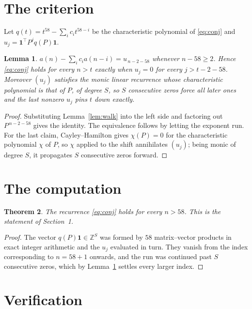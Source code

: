 \documentclass[11pt,a4paper]{article}
\theoremstyle{plain}
\newtheorem{theorem}{Theorem}
\newtheorem{lemma}[theorem]{Lemma}
\theoremstyle{definition}
\begin{document}
\section{The criterion}

Let $q(t)=t^{58}-\sum_i c_i t^{58-i}$ be the characteristic polynomial of
\eqref{eq:conj} and $u_j=\mathbf{1}^{\!\top}P^{j}q(P)\mathbf{1}$.

\begin{lemma}\label{lem:crit}
$a(n)-\sum_i c_i a(n-i)=u_{\,n-2-58}$ whenever $n-58\ge2$. Hence
\eqref{eq:conj} holds for every $n>t$ exactly when $u_j=0$ for every
$j>t-2-58$. Moreover $(u_j)$ satisfies the monic linear recurrence whose
characteristic polynomial is that of $P$, of degree $S$, so $S$ consecutive zeros force all
later ones and the last nonzero $u_j$ pins $t$ down exactly.
\end{lemma}

\begin{proof}
Substituting Lemma~\ref{lem:walk} into the left side and factoring out
$P^{\,n-2-58}$ gives the identity. The equivalence follows by letting the exponent
run. For the last claim, Cayley--Hamilton gives $\chi(P)=0$ for the characteristic
polynomial $\chi$ of $P$, so $\chi$ applied to the shift annihilates $(u_j)$; being monic of
degree $S$, it propagates $S$ consecutive zeros forward.
\end{proof}

\section{The computation}

\begin{theorem}
The recurrence \eqref{eq:conj} holds for every $n>58$. This is the statement of
Section~1.
\end{theorem}

\begin{proof}
The vector $q(P)\mathbf{1}\in\mathbb{Z}^{S}$ was formed by $58$ matrix--vector
products in exact integer arithmetic and the $u_j$ evaluated in turn. They vanish from the
index corresponding to $n=58+1$ onwards, and the run was continued past $S$ consecutive
zeros, which by Lemma~\ref{lem:crit} settles every larger index.
\end{proof}

\section{Verification}
\end{document}
